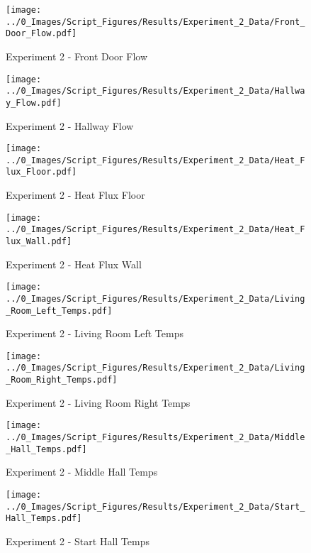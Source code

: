 	\begin{figure}[H]
		\centering
		\texttt{[image: ../0\_Images/Script\_Figures/Results/Experiment\_2\_Data/Front\_Door\_Flow.pdf]}
		\caption[]{Experiment 2 - Front Door Flow}
	\end{figure}
 
	\clearpage

	\begin{figure}[H]
		\centering
		\texttt{[image: ../0\_Images/Script\_Figures/Results/Experiment\_2\_Data/Hallway\_Flow.pdf]}
		\caption[]{Experiment 2 - Hallway Flow}
	\end{figure}
 

	\begin{figure}[H]
		\centering
		\texttt{[image: ../0\_Images/Script\_Figures/Results/Experiment\_2\_Data/Heat\_Flux\_Floor.pdf]}
		\caption[]{Experiment 2 - Heat Flux Floor}
	\end{figure}
 
	\clearpage

	\begin{figure}[H]
		\centering
		\texttt{[image: ../0\_Images/Script\_Figures/Results/Experiment\_2\_Data/Heat\_Flux\_Wall.pdf]}
		\caption[]{Experiment 2 - Heat Flux Wall}
	\end{figure}
 

	\begin{figure}[H]
		\centering
		\texttt{[image: ../0\_Images/Script\_Figures/Results/Experiment\_2\_Data/Living\_Room\_Left\_Temps.pdf]}
		\caption[]{Experiment 2 - Living Room Left Temps}
	\end{figure}
 
	\clearpage

	\begin{figure}[H]
		\centering
		\texttt{[image: ../0\_Images/Script\_Figures/Results/Experiment\_2\_Data/Living\_Room\_Right\_Temps.pdf]}
		\caption[]{Experiment 2 - Living Room Right Temps}
	\end{figure}
 

	\begin{figure}[H]
		\centering
		\texttt{[image: ../0\_Images/Script\_Figures/Results/Experiment\_2\_Data/Middle\_Hall\_Temps.pdf]}
		\caption[]{Experiment 2 - Middle Hall Temps}
	\end{figure}
 
	\clearpage

	\begin{figure}[H]
		\centering
		\texttt{[image: ../0\_Images/Script\_Figures/Results/Experiment\_2\_Data/Start\_Hall\_Temps.pdf]}
		\caption[]{Experiment 2 - Start Hall Temps}
	\end{figure}
 

